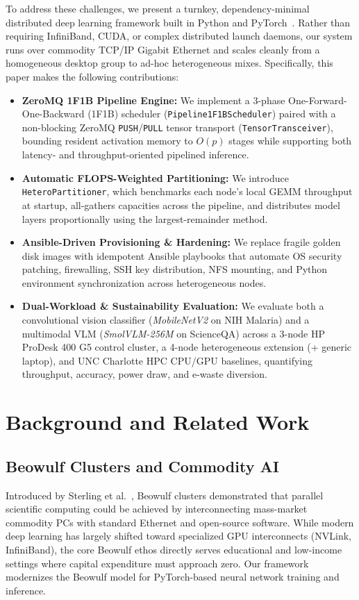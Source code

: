\documentclass[conference]{IEEEtran}
\begin{document}
To address these challenges, we present a turnkey, dependency-minimal distributed deep learning framework built in Python and PyTorch~\cite{pytorch2019}. Rather than requiring InfiniBand, CUDA, or complex distributed launch daemons, our system runs over commodity TCP/IP Gigabit Ethernet and scales cleanly from a homogeneous desktop group to ad-hoc heterogeneous mixes. Specifically, this paper makes the following contributions:
\begin{itemize}
    \item \textbf{ZeroMQ 1F1B Pipeline Engine:} We implement a 3-phase One-Forward-One-Backward (1F1B) scheduler (\texttt{Pipeline1F1BScheduler}) paired with a non-blocking ZeroMQ \texttt{PUSH}/\texttt{PULL} tensor transport (\texttt{TensorTransceiver}), bounding resident activation memory to $O(p)$ stages while supporting both latency- and throughput-oriented pipelined inference.
    \item \textbf{Automatic FLOPS-Weighted Partitioning:} We introduce \texttt{HeteroPartitioner}, which benchmarks each node's local GEMM throughput at startup, all-gathers capacities across the pipeline, and distributes model layers proportionally using the largest-remainder method.
    \item \textbf{Ansible-Driven Provisioning \& Hardening:} We replace fragile golden disk images with idempotent Ansible playbooks that automate OS security patching, firewalling, SSH key distribution, NFS mounting, and Python environment synchronization across heterogeneous nodes.
    \item \textbf{Dual-Workload & Sustainability Evaluation:} We evaluate both a convolutional vision classifier (\textit{MobileNetV2} on NIH Malaria) and a multimodal VLM (\textit{SmolVLM-256M} on ScienceQA) across a 3-node HP ProDesk 400 G5 control cluster, a 4-node heterogeneous extension (+ generic laptop), and UNC Charlotte HPC CPU/GPU baselines, quantifying throughput, accuracy, power draw, and e-waste diversion.
\end{itemize}

\section{Background and Related Work}

\subsection{Beowulf Clusters and Commodity AI}
Introduced by Sterling et al.~\cite{beowulf1995}, Beowulf clusters demonstrated that parallel scientific computing could be achieved by interconnecting mass-market commodity PCs with standard Ethernet and open-source software. While modern deep learning has largely shifted toward specialized GPU interconnects (NVLink, InfiniBand), the core Beowulf ethos directly serves educational and low-income settings where capital expenditure must approach zero. Our framework modernizes the Beowulf model for PyTorch-based neural network training and inference.
\end{document}
